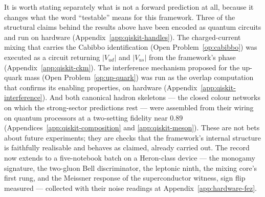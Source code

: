 It is worth stating separately what is not a forward prediction at all, because it changes what the
word ``testable'' means for this framework. Three of the structural claims behind the results above
have been encoded as quantum circuits and run on hardware
(Appendix~\ref{app:qiskit-handles}). The charged-current mixing that carries the Cabibbo
identification (Open Problem~\ref{op:cabibbo}) was executed as a circuit returning
$\lvert V_{ud}\rvert$ and $\lvert V_{us}\rvert$ from the framework's phase
(Appendix~\ref{app:qiskit-ckm}). The interference mechanism proposed for the up-quark mass
(Open Problem~\ref{op:up-quark}) was run as the overlap computation that confirms its enabling
properties, on hardware (Appendix~\ref{app:qiskit-interference}). And both canonical hadron
skeletons --- the closed colour networks on which the strong-sector predictions rest --- were
assembled from their wiring on quantum processors at a two-setting fidelity near $0.89$
(Appendices~\ref{app:qiskit-composition} and \ref{app:qiskit-meson}). These are not bets about future
experiments; they are checks that the framework's internal structure is faithfully realisable and
behaves as claimed, already carried out. The record now extends to a five-notebook batch on a
Heron-class device --- the monogamy signature, the two-gluon Bell discriminator, the leptonic
ninth, the mixing core's first rung, and the Meissner response of the superconductor witness,
sign flip measured --- collected with their noise readings at Appendix~\ref{app:hardware-fez}.

